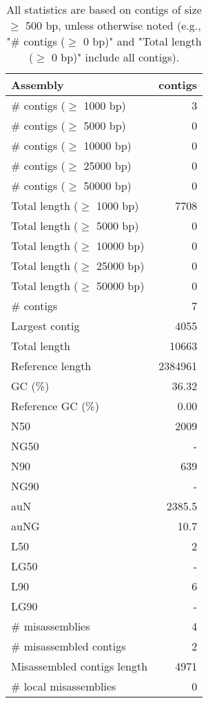 \documentclass[12pt,a4paper]{article}
\begin{document}
\begin{table}[ht]
\begin{center}
\caption{All statistics are based on contigs of size $\geq$ 500 bp, unless otherwise noted (e.g., "\# contigs ($\geq$ 0 bp)" and "Total length ($\geq$ 0 bp)" include all contigs).}
\begin{tabular}{|l*{1}{|r}|}
\hline
Assembly & contigs \\ \hline
\# contigs ($\geq$ 1000 bp) & 3 \\ \hline
\# contigs ($\geq$ 5000 bp) & 0 \\ \hline
\# contigs ($\geq$ 10000 bp) & 0 \\ \hline
\# contigs ($\geq$ 25000 bp) & 0 \\ \hline
\# contigs ($\geq$ 50000 bp) & 0 \\ \hline
Total length ($\geq$ 1000 bp) & 7708 \\ \hline
Total length ($\geq$ 5000 bp) & 0 \\ \hline
Total length ($\geq$ 10000 bp) & 0 \\ \hline
Total length ($\geq$ 25000 bp) & 0 \\ \hline
Total length ($\geq$ 50000 bp) & 0 \\ \hline
\# contigs & 7 \\ \hline
Largest contig & 4055 \\ \hline
Total length & 10663 \\ \hline
Reference length & 2384961 \\ \hline
GC (\%) & 36.32 \\ \hline
Reference GC (\%) & 0.00 \\ \hline
N50 & 2009 \\ \hline
NG50 & - \\ \hline
N90 & 639 \\ \hline
NG90 & - \\ \hline
auN & 2385.5 \\ \hline
auNG & 10.7 \\ \hline
L50 & 2 \\ \hline
LG50 & - \\ \hline
L90 & 6 \\ \hline
LG90 & - \\ \hline
\# misassemblies & 4 \\ \hline
\# misassembled contigs & 2 \\ \hline
Misassembled contigs length & 4971 \\ \hline
\# local misassemblies & 0 \\ \hline

\end{tabular}
\end{center}
\end{table}
\end{document}
